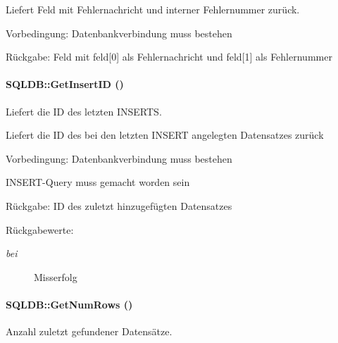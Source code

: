 Liefert Feld mit Fehlernachricht und interner Fehlernummer zurück. \begin{Desc}
\item[Vorbedingung:]Datenbankverbindung muss bestehen \end{Desc}
\begin{Desc}
\item[R\"{u}ckgabe:]Feld mit feld\mbox{[}0\mbox{]} als Fehlernachricht und feld\mbox{[}1\mbox{]} als Fehlernummer \end{Desc}
\hypertarget{classSQLDB_094a5b811d412900f2435cabb2194fb8}{
\paragraph[GetInsertID]{\setlength{\rightskip}{0pt plus 5cm}SQLDB::Get\-Insert\-ID ()}\hfill}
\label{classSQLDB_094a5b811d412900f2435cabb2194fb8}


Liefert die ID des letzten INSERTS. 

Liefert die ID des bei den letzten INSERT angelegten Datensatzes zurück \begin{Desc}
\item[Vorbedingung:]Datenbankverbindung muss bestehen 

INSERT-Query muss gemacht worden sein \end{Desc}
\begin{Desc}
\item[R\"{u}ckgabe:]ID des zuletzt hinzugefügten Datensatzes \end{Desc}
\begin{Desc}
\item[R\"{u}ckgabewerte:]
\begin{description}
\item[{\em bei}]Misserfolg \end{description}
\end{Desc}
\hypertarget{classSQLDB_15b181251b309ab55331be29fa33ac9f}{
\paragraph[GetNumRows]{\setlength{\rightskip}{0pt plus 5cm}SQLDB::Get\-Num\-Rows ()}\hfill}
\label{classSQLDB_15b181251b309ab55331be29fa33ac9f}


Anzahl zuletzt gefundener Datensätze. 

